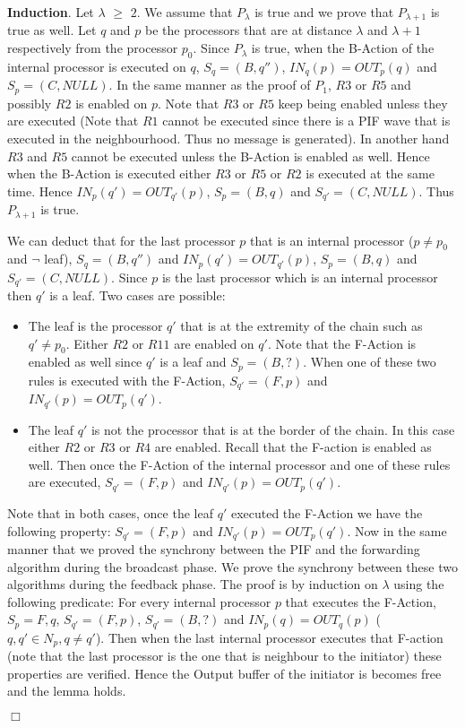 \documentclass{llncs}
\renewenvironment{proof}{{\it Proof. } }{{\hfill $\Box$}\vspace{.5pc}}
\begin{document}
\begin{proof}
\textbf{Induction}. Let $\lambda$ $\geq$ $2$. We assume that $P_{\lambda}$ is true and we prove that $P_{\lambda +1}$ is true as well. Let $q$ and $p$ be the processors that are at distance $\lambda$ and $\lambda +1$ respectively from the processor $p_{0}$. Since $P_{\lambda}$ is true, when the B-Action of the internal processor is executed on $q$, $S_{q}=(B,q'')$, $IN_{q}(p)=OUT_{p}(q)$ and $S_{p}=(C,NULL)$. In the same manner as the proof of $P_{1}$, $R3$ or $R5$ and possibly $R2$ is enabled on $p$. Note that $R3$ or $R5$ keep being enabled unless they are executed (Note that $R1$ cannot be executed since there is a PIF wave that is executed in the neighbourhood. Thus no message is generated). In another hand $R3$ and $R5$ cannot be executed unless the B-Action is enabled as well. Hence when the B-Action is executed either $R3$ or $R5$ or $R2$ is executed at the same time. Hence $IN_{p}(q')=OUT_{q'}(p)$, $S_{p}=(B,q)$ and $S_{q'}=(C,NULL)$. Thus $P_{\lambda +1}$ is true. 

We can deduct that for the last processor $p$ that is an internal processor ($p \ne p_0$ and $\neg$ leaf), $S_{q}=(B,q'')$ and $IN_{p}(q')=OUT_{q'}(p)$, $S_{p}=(B,q)$ and  $S_{q'}=(C,NULL)$. Since $p$ is the last processor which is an internal processor then $q'$ is a leaf. Two cases are possible:
\begin{itemize}
\item{The leaf is the processor $q'$ that is at the extremity of the chain such as $q' \ne p_0$. Either $R2$ or $R11$ are enabled on $q'$. Note that the F-Action is enabled as well since $q'$ is a leaf and $S_{p}=(B,?)$. When one of these two rules is executed with the F-Action, $S_{q'}=(F,p)$ and $IN_{q'}(p)=OUT_{p}(q')$.}
\item{The leaf $q'$ is not the processor that is at the border of the chain.} In this case either $R2$ or $R3$ or $R4$ are enabled. Recall that the F-action is enabled as well. Then once the F-Action of the internal processor and one of these rules are executed, $S_{q'}=(F,p)$ and $IN_{q'}(p)=OUT_{p}(q')$.
\end{itemize}

Note that in both cases, once the leaf $q'$ executed the F-Action we have the following property: $S_{q'}=(F,p)$ and $IN_{q'}(p)=OUT_{p}(q')$. Now in the same manner that we proved the synchrony between the PIF and the forwarding algorithm during the broadcast phase. We prove the synchrony between these two algorithms during the feedback phase. The proof is by induction on $\lambda$ using the following predicate: For every internal processor $p$ that executes the F-Action, $S_{p}={F,q}$, $S_{q'}=(F,p)$, $S_{q'}=(B,?)$ and $IN_{p}(q)=OUT_{q}(p)$ ($q,q' \in N_{p}, q\ne q'$). Then when the last internal processor executes that F-action (note that the last processor is the one that is neighbour to the initiator) these properties are verified. Hence the Output buffer of the initiator is becomes free and the lemma holds.

\end{proof}
\end{document}
